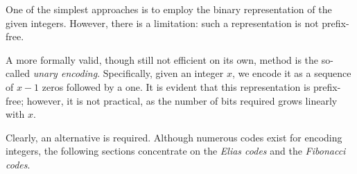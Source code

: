 \documentclass{subfiles}
\begin{document}
    One of the simplest approaches is to employ the binary representation of the 
    given integers. However, there is a limitation: such a representation is not 
    prefix-free.

    A more formally valid, though still not efficient on its own, method is the 
    so-called \emph{unary encoding}. Specifically, given an integer \(x\), we 
    encode it as a sequence of \(x - 1\) zeros followed by a one. It is evident 
    that this representation is prefix-free; however, it is not practical, as the 
    number of bits required grows linearly with \(x\).

    Clearly, an alternative is required. Although numerous codes exist for 
    encoding integers, the following sections concentrate on the \emph{Elias codes} 
    and the \emph{Fibonacci codes}.
\end{document}
